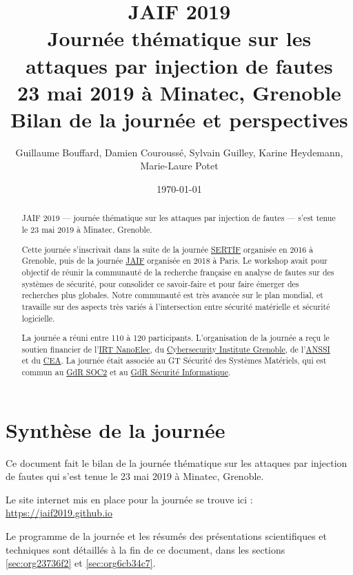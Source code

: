 \documentclass[a4paper,11pt]{article}
\author{Guillaume Bouffard,  Damien Couroussé, Sylvain Guilley,  Karine Heydemann, Marie-Laure Potet}
\date{\today}
\title{JAIF 2019 \\ Journée thématique sur les attaques par injection de fautes \\ 23 mai 2019 à Minatec, Grenoble\\\medskip
\large Bilan de la journée et perspectives}
\begin{document}
\maketitle
\setcounter{tocdepth}{1}
\tableofcontents

\begin{abstract}
JAIF 2019 --- journée thématique sur les attaques par injection de
fautes --- s'est tenue le 23 mai 2019 à Minatec, Grenoble.

Cette journée s’inscrivait dans la suite de la journée \href{https://lazart.gricad-pages.univ-grenoble-alpes.fr/sertif/pages/workshop.html}{SERTIF} organisée
en 2016 à Grenoble,
puis de la journée \href{https://wp-systeme.lip6.fr/jaif}{JAIF} organisée en 2018 à Paris.
Le workshop avait pour objectif de réunir la communauté de la
recherche française en analyse de fautes sur des systèmes de sécurité,
pour consolider ce savoir-faire et pour faire émerger des recherches
plus globales.  Notre communauté est très avancée sur le plan mondial,
et travaille sur des aspects très variés à l'intersection entre
sécurité matérielle et sécurité logicielle.

La journée a réuni entre 110 à 120 participants.  L'organisation de la
journée a reçu le soutien financier de l'\href{http://www.irtnanoelec.fr}{IRT NanoElec}, du
\href{https://cybersecurity.univ-grenoble-alpes.fr/}{Cybersecurity Institute Grenoble}, de l'\href{https://www.ssi.gouv.fr}{ANSSI} et du \href{http://www.cea-tech.fr}{CEA}.  La journée
était associée au GT Sécurité des Systèmes Matériels, qui est commun
au \href{http://www.gdr-soc.cnrs.fr}{GdR SOC2} et au \href{https://gdr-securite.irisa.fr}{GdR Sécurité Informatique}.
\end{abstract}

\pagebreak

\section{Synthèse de la journée}
\label{sec:orgb75c7e1}

Ce document fait le bilan de la journée thématique sur les attaques
par injection de fautes qui s'est tenue le 23 mai 2019 à Minatec, Grenoble.

Le site internet mis en place pour la journée se trouve ici :
\url{https://jaif2019.github.io}

Le programme de la journée et les résumés des présentations
scientifiques et techniques sont détaillés à la fin de ce document,
dans les sections \ref{sec:org23736f2} et \ref{sec:org6cb34c7}.
\end{document}
